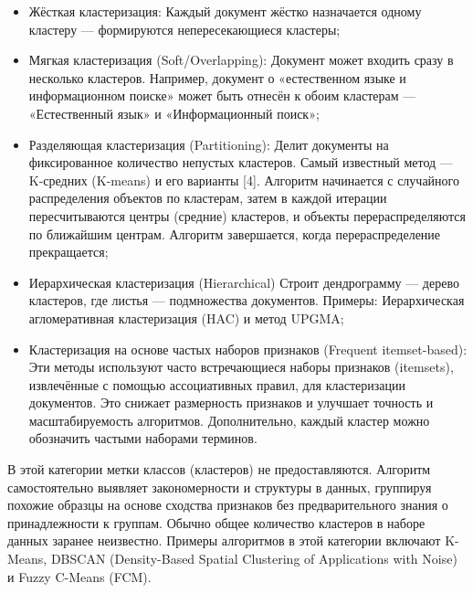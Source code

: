 \begin{itemize}
    \item Жёсткая кластеризация:
    Каждый документ жёстко назначается одному кластеру — формируются непересекающиеся кластеры;

    \item Мягкая кластеризация (Soft/Overlapping):
    Документ может входить сразу в несколько кластеров. Например, документ о «естественном языке и информационном поиске» может быть отнесён к обоим кластерам — «Естественный язык» и «Информационный поиск»;
     \item Разделяющая кластеризация (Partitioning):
    Делит документы на фиксированное количество непустых кластеров. Самый известный метод — K-средних (K-means) и его варианты [4]. Алгоритм начинается с случайного распределения объектов по кластерам, затем в каждой итерации пересчитываются центры (средние) кластеров, и объекты перераспределяются по ближайшим центрам. Алгоритм завершается, когда перераспределение прекращается;
     \item Иерархическая кластеризация (Hierarchical)
    Строит дендрограмму — дерево кластеров, где листья — подмножества документов. Примеры: Иерархическая агломеративная кластеризация (HAC) и метод UPGMA;
     \item Кластеризация на основе частых наборов признаков (Frequent itemset-based):
   Эти методы используют часто встречающиеся наборы признаков (itemsets), извлечённые с помощью ассоциативных правил, для кластеризации документов. Это снижает размерность признаков и улучшает точность и масштабируемость алгоритмов. Дополнительно, каждый кластер можно обозначить частыми наборами терминов.
\end{itemize}


   
В этой категории метки классов (кластеров) не предоставляются. Алгоритм самостоятельно выявляет закономерности и структуры в данных, группируя похожие образцы на основе сходства признаков без предварительного знания о принадлежности к группам. Обычно общее количество кластеров в наборе данных заранее неизвестно. Примеры алгоритмов в этой категории включают K-Means, DBSCAN (Density-Based Spatial Clustering of Applications with Noise) и Fuzzy C-Means (FCM).



